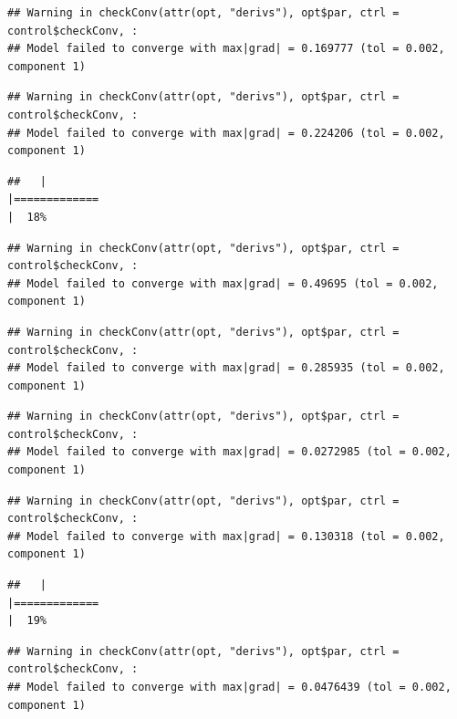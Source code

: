 \documentclass[
  12pt,
]{book}
\begin{document}
\begin{verbatim}
## Warning in checkConv(attr(opt, "derivs"), opt$par, ctrl = control$checkConv, :
## Model failed to converge with max|grad| = 0.169777 (tol = 0.002, component 1)
\end{verbatim}

\begin{verbatim}
## Warning in checkConv(attr(opt, "derivs"), opt$par, ctrl = control$checkConv, :
## Model failed to converge with max|grad| = 0.224206 (tol = 0.002, component 1)
\end{verbatim}

\begin{verbatim}
##   |                                                                              |=============                                                         |  18%
\end{verbatim}

\begin{verbatim}
## Warning in checkConv(attr(opt, "derivs"), opt$par, ctrl = control$checkConv, :
## Model failed to converge with max|grad| = 0.49695 (tol = 0.002, component 1)
\end{verbatim}

\begin{verbatim}
## Warning in checkConv(attr(opt, "derivs"), opt$par, ctrl = control$checkConv, :
## Model failed to converge with max|grad| = 0.285935 (tol = 0.002, component 1)
\end{verbatim}

\begin{verbatim}
## Warning in checkConv(attr(opt, "derivs"), opt$par, ctrl = control$checkConv, :
## Model failed to converge with max|grad| = 0.0272985 (tol = 0.002, component 1)
\end{verbatim}

\begin{verbatim}
## Warning in checkConv(attr(opt, "derivs"), opt$par, ctrl = control$checkConv, :
## Model failed to converge with max|grad| = 0.130318 (tol = 0.002, component 1)
\end{verbatim}

\begin{verbatim}
##   |                                                                              |=============                                                         |  19%
\end{verbatim}

\begin{verbatim}
## Warning in checkConv(attr(opt, "derivs"), opt$par, ctrl = control$checkConv, :
## Model failed to converge with max|grad| = 0.0476439 (tol = 0.002, component 1)
\end{verbatim}
\end{document}
